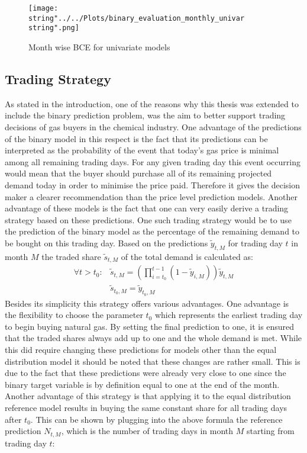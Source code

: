 \begin{figure}[h!]
  \centering
\texttt{[image: \\string"../../Plots/binary\_evaluation\_monthly\_univar\\string".png]}
  \caption{Month wise BCE for univariate models}\label{fig:binary_evaluation_monthly_univar}
\end{figure}

\subsection{Trading Strategy}
As stated in the introduction, one of the reasons why this thesis was extended to include the binary prediction problem, was the aim to better support trading decisions of gas buyers in the chemical industry. One advantage of the predictions of the binary model in this respect is the fact that its predictions can be interpreted as the probability of the event that today's gas price is minimal among all remaining trading days. For any given trading day this event occurring would mean that the buyer should purchase all of its remaining projected demand today in order to minimise the price paid. Therefore it gives the decision maker a clearer recommendation than the price level prediction models. Another advantage of these models is the fact that one can very easily derive a trading strategy based on these predictions.
One such trading strategy would be to use the prediction of the binary model as the percentage of the remaining demand to be bought on this trading day. Based on the predictions $\tilde{y}_{t,M}$ for 
trading day $t$ in month $M$ the traded share $\tilde{s}_{t,M}$ of the total demand is calculated as:
\begin{align*}
\forall t > t_0: &\tilde{s}_{t,M} = (\prod_{i = t_{0}}^{t-1}(1-\tilde{y}_{i,M}))\tilde{y}_{t,M}\\
&\tilde{s}_{t_0,M} = \tilde{y}_{t_0,M}
\end{align*}
Besides its simplicity this strategy offers various advantages. One advantage is the flexibility to choose the parameter $t_0$ which represents the earliest trading day to begin buying natural gas. By setting the final prediction to one, it is ensured that the traded shares always add up to one and the whole demand is met. While this did require changing these predictions for models other than the equal distribution model it should be noted that these changes are rather small. This is due to the fact that these predictions were already very close to one since the binary target variable is by definition equal to one at the end of the month. Another advantage of this strategy is that applying it to the equal distribution reference model results in buying the same constant share for all trading days after $t_0$. This can be shown by plugging into the above formula the reference prediction $N_{t,M}$, which is the number of trading days in month $M$ starting from trading day $t$:
